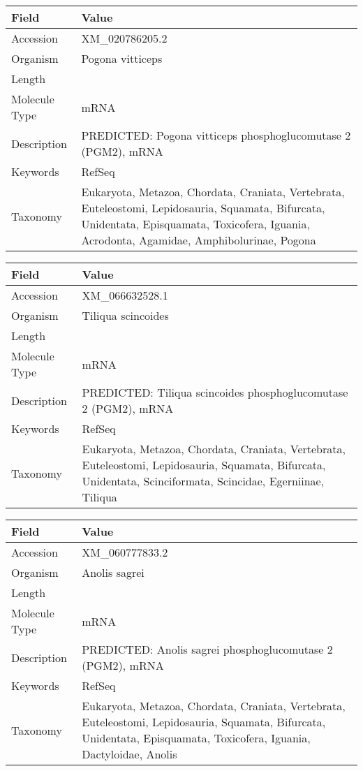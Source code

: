 \documentclass[10pt]{article}
\begin{document}
{\footnotesize
\begin{longtable}{>{\raggedright\arraybackslash}p{4.5cm} >{\raggedright\arraybackslash}p{11.5cm}}
\textbf{Field} & \textbf{Value} \\
\hline
Accession & XM\_020786205.2 \\
Organism & Pogona vitticeps \\
Length & 3252 \\
Molecule Type & mRNA \\
Description & PREDICTED: Pogona vitticeps phosphoglucomutase 2 (PGM2), mRNA \\
Keywords & RefSeq \\
Taxonomy & Eukaryota, Metazoa, Chordata, Craniata, Vertebrata, Euteleostomi, Lepidosauria, Squamata, Bifurcata, Unidentata, Episquamata, Toxicofera, Iguania, Acrodonta, Agamidae, Amphibolurinae, Pogona \\
\end{longtable}
}

{\footnotesize
\begin{longtable}{>{\raggedright\arraybackslash}p{4.5cm} >{\raggedright\arraybackslash}p{11.5cm}}
\textbf{Field} & \textbf{Value} \\
\hline
Accession & XM\_066632528.1 \\
Organism & Tiliqua scincoides \\
Length & 4798 \\
Molecule Type & mRNA \\
Description & PREDICTED: Tiliqua scincoides phosphoglucomutase 2 (PGM2), mRNA \\
Keywords & RefSeq \\
Taxonomy & Eukaryota, Metazoa, Chordata, Craniata, Vertebrata, Euteleostomi, Lepidosauria, Squamata, Bifurcata, Unidentata, Scinciformata, Scincidae, Egerniinae, Tiliqua \\
\end{longtable}
}

{\footnotesize
\begin{longtable}{>{\raggedright\arraybackslash}p{4.5cm} >{\raggedright\arraybackslash}p{11.5cm}}
\textbf{Field} & \textbf{Value} \\
\hline
Accession & XM\_060777833.2 \\
Organism & Anolis sagrei \\
Length & 3100 \\
Molecule Type & mRNA \\
Description & PREDICTED: Anolis sagrei phosphoglucomutase 2 (PGM2), mRNA \\
Keywords & RefSeq \\
Taxonomy & Eukaryota, Metazoa, Chordata, Craniata, Vertebrata, Euteleostomi, Lepidosauria, Squamata, Bifurcata, Unidentata, Episquamata, Toxicofera, Iguania, Dactyloidae, Anolis \\
\end{longtable}
}
\end{document}
